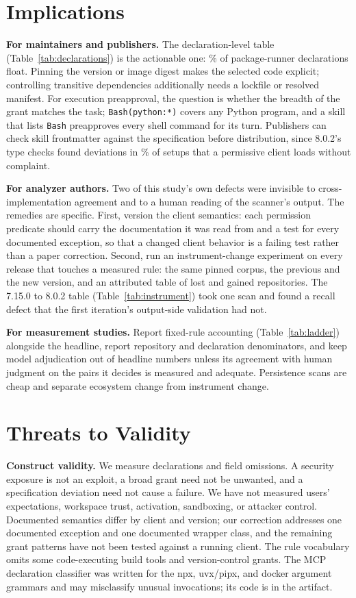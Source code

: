 \documentclass[10pt,conference]{IEEEtran}
\newcommand{\vold}{7.15.0}
\newcommand{\vnew}{8.0.2}
\newcommand{\pct}[1]{#1\%}
\begin{document}
\section{Implications}

\textbf{For maintainers and publishers.} The declaration-level table (Table~\ref{tab:declarations}) is the actionable one: \pct{\DeclPctUnpinnedOrTag} of package-runner declarations float. Pinning the version or image digest makes the selected code explicit; controlling transitive dependencies additionally needs a lockfile or resolved manifest. For execution preapproval, the question is whether the breadth of the grant matches the task; \texttt{Bash(python:*)} covers any Python program, and a skill that lists \texttt{Bash} preapproves every shell command for its turn. Publishers can check skill frontmatter against the specification before distribution, since \vnew{}'s type checks found deviations in \pct{\PThreeSetupsPct} of setups that a permissive client loads without complaint.

\textbf{For analyzer authors.} Two of this study's own defects were invisible to cross-implementation agreement and to a human reading of the scanner's output. The remedies are specific. First, version the client semantics: each permission predicate should carry the documentation it was read from and a test for every documented exception, so that a changed client behavior is a failing test rather than a paper correction. Second, run an instrument-change experiment on every release that touches a measured rule: the same pinned corpus, the previous and the new version, and an attributed table of lost and gained repositories. The \vold{} to \vnew{} table (Table~\ref{tab:instrument}) took one scan and found a recall defect that the first iteration's output-side validation had not.

\textbf{For measurement studies.} Report fixed-rule accounting (Table~\ref{tab:ladder}) alongside the headline, report repository and declaration denominators, and keep model adjudication out of headline numbers unless its agreement with human judgment on the pairs it decides is measured and adequate. Persistence scans are cheap and separate ecosystem change from instrument change.

\section{Threats to Validity}

\textbf{Construct validity.} We measure declarations and field omissions. A security exposure is not an exploit, a broad grant need not be unwanted, and a specification deviation need not cause a failure. We have not measured users' expectations, workspace trust, activation, sandboxing, or attacker control. Documented semantics differ by client and version; our correction addresses one documented exception and one documented wrapper class, and the remaining grant patterns have not been tested against a running client. The rule vocabulary omits some code-executing build tools and version-control grants. The MCP declaration classifier was written for the npx, uvx/pipx, and docker argument grammars and may misclassify unusual invocations; its code is in the artifact.
\end{document}
